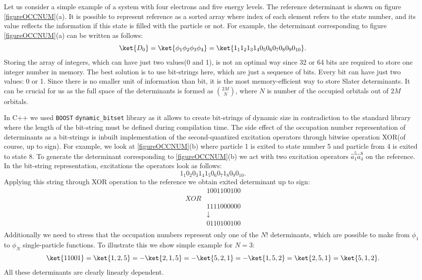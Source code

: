 \documentclass[twoside,english]{uiofysmaster}
\newcommand{\classname}[1]{\texttt{#1}}
\begin{document}
Let us consider a simple example of a system with four electrons and five energy levels. The reference determinant is shown on figure \ref{figureOCCNUM}(a). It is possible to represent reference as a sorted array where index of each element refers to the state number, and its value reflects the information if this state is filled with the particle or not.
For example, the determinant corresponding to figure \ref{figureOCCNUM}(a) can be written as follows:
\[
\ket{D_0} = \ket{\phi_1 \phi_2 \phi_3 \phi_4} = \ket{1_1 1_2 1_3 1_4 0_5 0_6 0_7 0_8 0_9 0_{10} }.
\]
Storing the array of integers, which can have just two values(0 and 1), is not an optimal way since 32 or 64 bits are required to store one integer number in memory. The best solution is to use bit-strings here, which are just a sequence of bits. Every bit can have just two values: 0 or 1.
Since there is no smaller unit of information than bit, it is the most memory-efficient way to store Slater determinants. It can be crucial for us as the full space of the determinants is formed as $\binom {2M}{N}$, where $N$ is number of the occupied orbitals out of $2M$ orbitals.

In C++ we used \classname{BOOST} \classname{dynamic_bitset} library as it allows to create bit-strings of dynamic size in contradiction to the standard library where the length of the bit-string must be defined during compilation time.
The side effect of the occupation number representation of determinants as a bit-strings is inbuilt implementation of the second-quantized excitation operators through bitwise operation XOR(of course, up to sign). For example, we look at \ref{figureOCCNUM}(b) where particle 1 is exited to state number 5 and particle from 4 is exited to state 8. To generate the determinant corresponding to \ref{figureOCCNUM}(b) we act with two excitation operators $\hat{a}_1^5 \hat{a}_4^8$ on the reference. In the bit-string representation, excitations the operators look as follows:
\[
1_1 0_2 0_3 1_4 1_5 0_6 0_7 1_8 0_9 0_{10}.
\]
Applying this string through XOR operation to the reference we obtain exited determinant up to sign:
\[
\begin{matrix} 
&1001100100 \\
XOR& \\
&1111000000\\
&\downarrow \\
&0110100100\\
\end{matrix}
\]
Additionally we need to stress that the occupation numbers represent only one of the $N!$ determinants, which are possible to make from $\phi_1$ to $\phi_N$ single-particle functions. To illustrate this we show simple example for $N=3$:
\[
\ket{11001} = \ket{1,2,5} = -\ket{2,1,5} = -\ket{5,2,1} = -\ket{1,5,2} = \ket{2,5,1} = \ket{5,1,2}.
\]
All these determinants are clearly linearly dependent.
\end{document}

